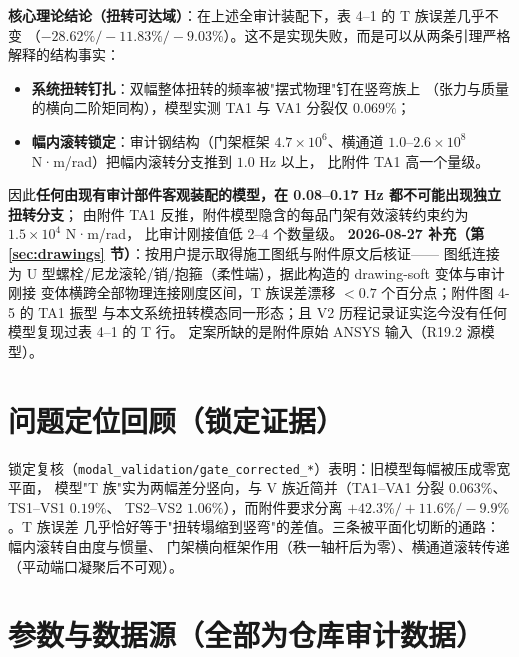 \documentclass[11pt,a4paper]{ctexart}
\begin{document}
\textbf{核心理论结论（扭转可达域）}：在上述全审计装配下，表 4--1 的 T 族误差几乎不变
（$-28.62\%/-11.83\%/-9.03\%$）。这不是实现失败，而是可以从两条引理严格解释的结构事实：
\begin{itemize}
  \item \textbf{系统扭转钉扎}：双幅整体扭转的频率被"摆式物理"钉在竖弯族上
        （张力与质量的横向二阶矩同构），模型实测 TA1 与 VA1 分裂仅 $0.069\%$；
  \item \textbf{幅内滚转锁定}：审计钢结构（门架框架 $4.7\times10^{6}$、横通道
        $1.0\text{--}2.6\times10^{8}$ N·m/rad）把幅内滚转分支推到 $1.0$ Hz 以上，
        比附件 TA1 高一个量级。
\end{itemize}
因此\textbf{任何由现有审计部件客观装配的模型，在 0.08--0.17 Hz 都不可能出现独立扭转分支}；
由附件 TA1 反推，附件模型隐含的每品门架有效滚转约束约为 $1.5\times10^{4}$ N·m/rad，
比审计刚接值低 2--4 个数量级。
\textbf{2026-08-27 补充（第 \ref{sec:drawings} 节）}：按用户提示取得施工图纸与附件原文后核证——
图纸连接为 U 型螺栓/尼龙滚轮/销/抱箍（柔性端），据此构造的 drawing-soft 变体与审计刚接
变体横跨全部物理连接刚度区间，T 族误差漂移 $<0.7$ 个百分点；附件图 4-5 的 TA1 振型
与本文系统扭转模态同一形态；且 V2 历程记录证实迄今没有任何模型复现过表 4--1 的 T 行。
定案所缺的是附件原始 ANSYS 输入（R19.2 源模型）。

\section{问题定位回顾（锁定证据）}\label{sec:diag}

锁定复核（\texttt{modal\_validation/gate\_corrected\_*}）表明：旧模型每幅被压成零宽平面，
模型"T 族"实为两幅差分竖向，与 V 族近简并（TA1--VA1 分裂 $0.063\%$、TS1--VS1 $0.19\%$、
TS2--VS2 $1.06\%$），而附件要求分离 $+42.3\%/+11.6\%/-9.9\%$。T 族误差
几乎恰好等于"扭转塌缩到竖弯"的差值。三条被平面化切断的通路：幅内滚转自由度与惯量、
门架横向框架作用（秩一轴杆后为零）、横通道滚转传递（平动端口凝聚后不可观）。

\section{参数与数据源（全部为仓库审计数据）}\label{sec:data}
\end{document}
